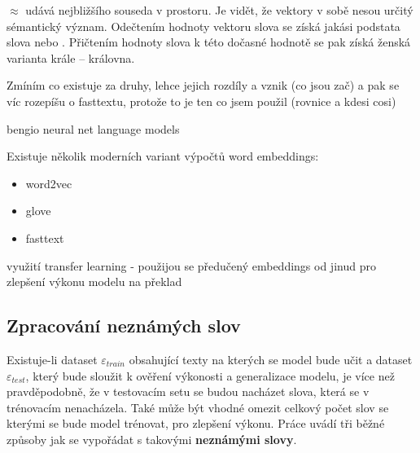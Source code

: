 $\approx$ udává nejbližšího souseda v prostoru. Je vidět, že vektory v sobě nesou určitý sémantický význam. Odečtením hodnoty vektoru slova  se získá jakási podstata slova  nebo . Přičtením hodnoty slova  k této dočasné hodnotě se pak získá ženská varianta krále -- královna.




Zmíním co existuje za druhy, lehce jejich rozdíly a vznik (co jsou zač) a pak se víc rozepíšu o fasttextu, protože to je ten co jsem použil (rovnice a kdesi cosi)


bengio neural net language models\cite{Bengio:2008}


Existuje několik moderních variant výpočtů word embeddings:
\begin{itemize}
  \item word2vec \cite{word2vec}
  \item glove  \cite{glove}
  \item fasttext \cite{fasttext}
\end{itemize}

využití transfer learning - použijou se předučený embeddings od jinud pro zlepšení výkonu modelu na překlad

\subsection{Zpracování neznámých slov}
Existuje-li dataset $\varepsilon_{train}$ obsahující texty na kterých se model bude učit a dataset $\varepsilon_{test}$, který bude sloužit k ověření výkonosti a generalizace modelu, je více než pravděpodobně, že v testovacím setu se budou nacházet slova, která se v trénovacím nenacházela. Také může být vhodné omezit celkový počet slov se kterými se bude model trénovat, pro zlepšení výkonu. Práce \cite{nmtTutorial} uvádí tři běžné způsoby jak se vypořádat s takovými \textbf{neznámými slovy}.


